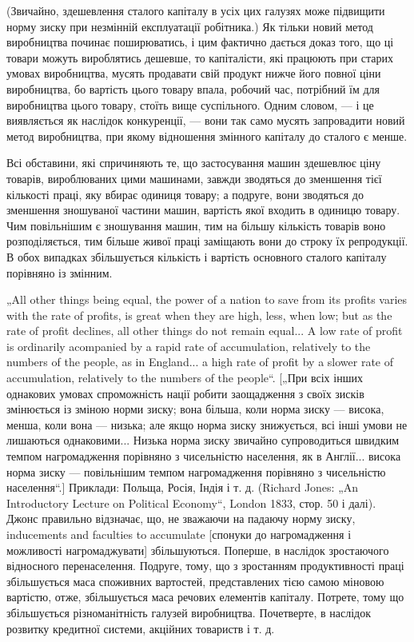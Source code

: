 (Звичайно, здешевлення сталого капіталу в усіх цих галузях
може підвищити норму зиску при незмінній експлуатації робітника.)
Як тільки новий метод виробництва починає поширюватись,
і цим фактично дається доказ того, що ці товари можуть
вироблятись дешевше, то капіталісти, які працюють при старих
умовах виробництва, мусять продавати свій продукт нижче
його повної ціни виробництва, бо вартість цього товару впала,
робочий час, потрібний їм для виробництва цього товару, стоїть
вище суспільного. Одним словом, — і це виявляється як наслідок
конкуренції, — вони так само мусять запровадити новий метод
виробництва, при якому відношення змінного капіталу до
сталого є менше.

Всі обставини, які спричиняють те, що застосування машин
здешевлює ціну товарів, вироблюваних цими машинами,
завжди зводяться до зменшення тієї кількості праці, яку вбирає
одиниця товару; а подруге, вони зводяться до зменшення
зношуваної частини машин, вартість якої входить в одиницю
товару. Чим повільнішим є зношування машин, тим на більшу
кількість товарів воно розподіляється, тим більше живої праці
заміщають вони до строку їх репродукції. В обох випадках
збільшується кількість і вартість основного сталого капіталу
порівняно із змінним.

„All other things being equal, the power of a nation to save from
its profits varies with the rate of profits, is great when they are high,
less, when low; but as the rate of profit declines, all other things do
not remain equal... A low rate of profit is ordinarily acompanied by
a rapid rate of accumulation, relatively to the numbers of the people,
as in England... a high rate of profit by a slower rate of accumulation,
relatively to the numbers of the people“. [„При всіх інших
однакових умовах спроможність нації робити заощадження з своїх
зисків змінюється із зміною норми зиску; вона більша, коли
норма зиску — висока, менша, коли вона — низька; але якщо
норма зиску знижується, всі інші умови не лишаються однаковими...
Низька норма зиску звичайно супроводиться швидким
темпом нагромадження порівняно з чисельністю населення,
як в Англії... висока норма зиску — повільнішим темпом нагромадження
порівняно з чисельністю населення“.] Приклади: Польща,
Росія, Індія і т. д. (Richard Jones: „An Introductory Lecture on Political
Economy“, London 1833, стор. 50 і далі). Джонс правильно відзначає,
що, не зважаючи на падаючу норму зиску, inducements
and faculties to accumulate [спонуки до нагромадження і можливості
нагромаджувати] збільшуються. Поперше, в наслідок зростаючого
відносного перенаселення. Подруге, тому, що з зростанням
продуктивності праці збільшується маса споживних вартостей,
представлених тією самою міновою вартістю, отже, збільшується
маса речових елементів капіталу. Потрете, тому що
збільшується різноманітність галузей виробництва. Почетверте,
в наслідок розвитку кредитної системи, акційних товариств і т. д.
